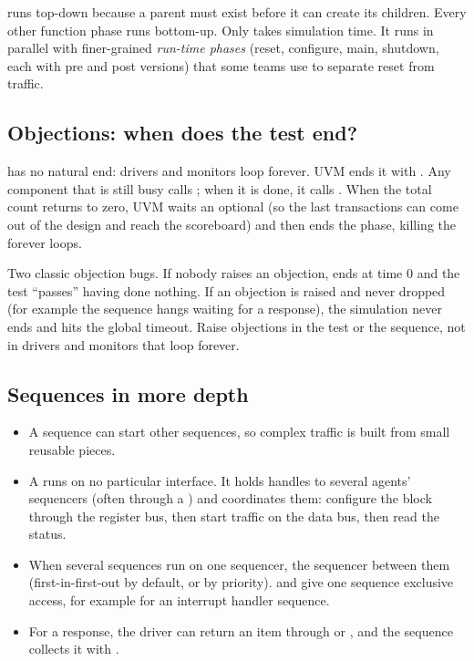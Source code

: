  runs top-down because a parent must exist before it can create its children. Every other function phase runs bottom-up. Only  takes simulation time. It runs in parallel with finer-grained \emph{run-time phases} (reset, configure, main, shutdown, each with pre and post versions) that some teams use to separate reset from traffic.

\subsection*{Objections: when does the test end?}

 has no natural end: drivers and monitors loop forever. UVM ends it with . Any component that is still busy calls ; when it is done, it calls . When the total count returns to zero, UVM waits an optional  (so the last transactions can come out of the design and reach the scoreboard) and then ends the phase, killing the forever loops.

\begin{trap}
Two classic objection bugs. If nobody raises an objection,  ends at time 0 and the test ``passes'' having done nothing. If an objection is raised and never dropped (for example the sequence hangs waiting for a response), the simulation never ends and hits the global timeout. Raise objections in the test or the sequence, not in drivers and monitors that loop forever.
\end{trap}

\subsection*{Sequences in more depth}

\begin{itemize}
  \item A sequence can start other sequences, so complex traffic is built from small reusable pieces.
  \item A  runs on no particular interface. It holds handles to several agents' sequencers (often through a ) and coordinates them: configure the block through the register bus, then start traffic on the data bus, then read the status.
  \item When several sequences run on one sequencer, the sequencer  between them (first-in-first-out by default, or by priority).  and  give one sequence exclusive access, for example for an interrupt handler sequence.
  \item For a response, the driver can return an item through  or , and the sequence collects it with .
\end{itemize}

